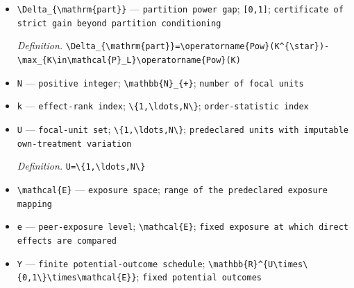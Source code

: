 \documentclass{article}
\begin{document}
\begin{itemize}
  \item \texttt{\textbackslash{}\allowbreak{}Delta\_\allowbreak{}\{\textbackslash{}\allowbreak{}mathrm\{part\}\allowbreak{}\}\allowbreak{}} --- \texttt{partition power gap}; \texttt{[0,\allowbreak{}1]}; \texttt{certificate of strict gain beyond partition conditioning}
  \par\smallskip\noindent\emph{Definition.} \texttt{\textbackslash{}\allowbreak{}Delta\_\allowbreak{}\{\textbackslash{}\allowbreak{}mathrm\{part\}\allowbreak{}\}\allowbreak{}=\allowbreak{}\textbackslash{}\allowbreak{}operatorname\{Pow\}\allowbreak{}(K\textasciicircum{}\{\textbackslash{}\allowbreak{}star\}\allowbreak{})-\allowbreak{}\textbackslash{}\allowbreak{}max\_\allowbreak{}\{K\textbackslash{}\allowbreak{}in\textbackslash{}\allowbreak{}mathcal\{P\}\allowbreak{}\_\allowbreak{}L\}\allowbreak{}\textbackslash{}\allowbreak{}operatorname\{Pow\}\allowbreak{}(K)}
  \item \texttt{N} --- \texttt{positive integer}; \texttt{\textbackslash{}\allowbreak{}mathbb\{N\}\allowbreak{}\_\allowbreak{}\{+\allowbreak{}\}\allowbreak{}}; \texttt{number of focal units}
  \item \texttt{k} --- \texttt{effect-\allowbreak{}rank index}; \texttt{\textbackslash{}\allowbreak{}\{1,\allowbreak{}\textbackslash{}\allowbreak{}ldots,\allowbreak{}N\textbackslash{}\allowbreak{}\}\allowbreak{}}; \texttt{order-\allowbreak{}statistic index}
  \item \texttt{U} --- \texttt{focal-\allowbreak{}unit set}; \texttt{\textbackslash{}\allowbreak{}\{1,\allowbreak{}\textbackslash{}\allowbreak{}ldots,\allowbreak{}N\textbackslash{}\allowbreak{}\}\allowbreak{}}; \texttt{predeclared units with imputable own-\allowbreak{}treatment variation}
  \par\smallskip\noindent\emph{Definition.} \texttt{U=\allowbreak{}\textbackslash{}\allowbreak{}\{1,\allowbreak{}\textbackslash{}\allowbreak{}ldots,\allowbreak{}N\textbackslash{}\allowbreak{}\}\allowbreak{}}
  \item \texttt{\textbackslash{}\allowbreak{}mathcal\{E\}\allowbreak{}} --- \texttt{exposure space}; \texttt{range of the predeclared exposure mapping}
  \item \texttt{e} --- \texttt{peer-\allowbreak{}exposure level}; \texttt{\textbackslash{}\allowbreak{}mathcal\{E\}\allowbreak{}}; \texttt{fixed exposure at which direct effects are compared}
  \item \texttt{Y} --- \texttt{finite potential-\allowbreak{}outcome schedule}; \texttt{\textbackslash{}\allowbreak{}mathbb\{R\}\allowbreak{}\textasciicircum{}\{U\textbackslash{}\allowbreak{}times\textbackslash{}\allowbreak{}\{0,\allowbreak{}1\textbackslash{}\allowbreak{}\}\allowbreak{}\textbackslash{}\allowbreak{}times\textbackslash{}\allowbreak{}mathcal\{E\}\allowbreak{}\}\allowbreak{}}; \texttt{fixed potential outcomes}

\end{itemize}
\end{document}
